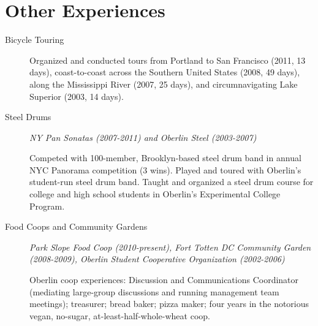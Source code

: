 \documentclass{article}
\begin{document}
	\section*{Other Experiences}
	\begin{description}
			\item[Bicycle Touring] Organized and conducted tours from
			Portland to San Francisco (2011, 13 days), 
			coast-to-coast across the Southern United States (2008, 49 days),
			along the Mississippi River (2007, 25 days), and
			circumnavigating Lake Superior (2003, 14 days).
					
			\item[Steel Drums] \emph{NY Pan Sonatas (2007-2011) and Oberlin Steel (2003-2007)}

			Competed with 100-member, Brooklyn-based steel drum band in 
			annual NYC Panorama competition (3 wins).
			Played and toured with Oberlin's student-run steel drum band.
			Taught and organized a steel drum course for college and high 
			school students in Oberlin's Experimental College Program.
			
			\item[Food Coops and Community Gardens] 
			\emph{Park Slope Food Coop (2010-present), 
				Fort Totten DC Community Garden (2008-2009),
				Oberlin Student Cooperative Organization (2002-2006)
			}

			Oberlin coop experiences:
			Discussion and Communications Coordinator 
			(mediating large-group discussions and running management team meetings);
			treasurer; bread baker; pizza maker; 
			four years in the notorious vegan, no-sugar, at-least-half-whole-wheat coop.
	\end{description} 
			
\end{document}
